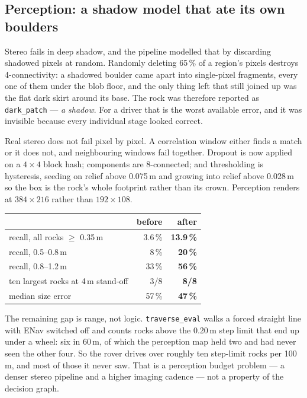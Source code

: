 \documentclass[11pt]{article}
\begin{document}
\subsection{Perception: a shadow model that ate its own boulders}
Stereo fails in deep shadow, and the pipeline modelled that by discarding shadowed pixels at random. Randomly deleting 65\,\% of a region's pixels destroys 4-connectivity: a shadowed boulder came apart into single-pixel fragments, every one of them under the blob floor, and the only thing left that still joined up was the flat dark skirt around its base. The rock was therefore reported as \texttt{dark\_patch} --- \emph{a shadow}. For a driver that is the worst available error, and it was invisible because every individual stage looked correct.

Real stereo does not fail pixel by pixel. A correlation window either finds a match or it does not, and neighbouring windows fail together. Dropout is now applied on a $4\times4$ block hash; components are 8-connected; and thresholding is hysteresis, seeding on relief above 0.075\,m and growing into relief above 0.028\,m so the box is the rock's whole footprint rather than its crown. Perception renders at $384\times216$ rather than $192\times108$.

\begin{center}
\begin{tabular}{@{}lrr@{}}
\toprule
& before & after \\
\midrule
recall, all rocks $\geq$ 0.35\,m & 3.6\,\% & \textbf{13.9\,\%} \\
recall, 0.5--0.8\,m & 8\,\% & \textbf{20\,\%} \\
recall, 0.8--1.2\,m & 33\,\% & \textbf{56\,\%} \\
ten largest rocks at 4\,m stand-off & 3/8 & \textbf{8/8} \\
median size error & 57\,\% & \textbf{47\,\%} \\
\bottomrule
\end{tabular}
\end{center}

The remaining gap is range, not logic. \texttt{traverse\_eval} walks a forced straight line with ENav switched off and counts rocks above the 0.20\,m step limit that end up under a wheel: six in 60\,m, of which the perception map held two and had never seen the other four. So the rover drives over roughly ten step-limit rocks per 100\,m, and most of those it never saw. That is a perception budget problem --- a denser stereo pipeline and a higher imaging cadence --- not a property of the decision graph.
\end{document}
